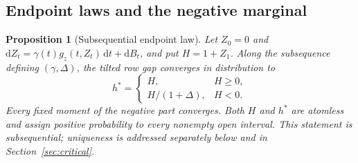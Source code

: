 \documentclass[11pt,a4paper]{article}
\numberwithin{equation}{section}
\newtheorem{proposition}[theorem]{Proposition}
\theoremstyle{definition}
\theoremstyle{remark}
\newcommand{\dd}{\mathrm d}
\begin{document}
\subsection{Endpoint laws and the negative marginal}

\begin{proposition}[Subsequential endpoint law]\label{zero:endpoint}
Let \(Z_0=0\) and
\(\dd Z_t=\gamma(t)g_z(t,Z_t)\,\dd t+\dd B_t\), and put \(H=1+Z_1\).
Along the subsequence defining \((\gamma,\Delta)\), the tilted row gap
converges in distribution to
\begin{equation}
 h^*=\begin{cases}
 H,&H\ge0,\\[2pt]
 H/(1+\Delta),&H<0.
 \end{cases}
 \label{eq:src16}
\end{equation}
Every fixed moment of the negative part converges.  Both \(H\) and
\(h^*\) are atomless and assign positive probability to every nonempty
open interval.  This statement is subsequential; uniqueness is addressed
separately below and in Section~\ref{sec:critical}.
\end{proposition}
\end{document}
